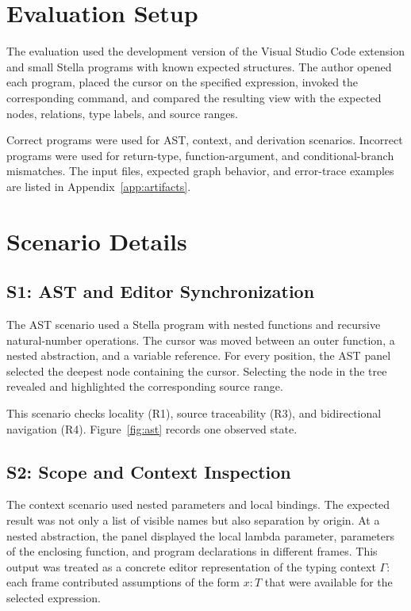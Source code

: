 \section{Evaluation Setup}

The evaluation used the development version of the Visual Studio Code extension and small Stella programs with known expected structures. The author opened each program, placed the cursor on the specified expression, invoked the corresponding command, and compared the resulting view with the expected nodes, relations, type labels, and source ranges.

Correct programs were used for AST, context, and derivation scenarios. Incorrect programs were used for return-type, function-argument, and conditional-branch mismatches. The input files, expected graph behavior, and error-trace examples are listed in Appendix~\ref{app:artifacts}.

\section{Scenario Details}

\subsection{S1: AST and Editor Synchronization}

The AST scenario used a Stella program with nested functions and recursive natural-number operations. The cursor was moved between an outer function, a nested abstraction, and a variable reference. For every position, the AST panel selected the deepest node containing the cursor. Selecting the node in the tree revealed and highlighted the corresponding source range.

This scenario checks locality (R1), source traceability (R3), and bidirectional navigation (R4). Figure~\ref{fig:ast} records one observed state.

\subsection{S2: Scope and Context Inspection}

The context scenario used nested parameters and local bindings. The expected result was not only a list of visible names but also separation by origin. At a nested abstraction, the panel displayed the local lambda parameter, parameters of the enclosing function, and program declarations in different frames. This output was treated as a concrete editor representation of the typing context $\Gamma$: each frame contributed assumptions of the form $x:T$ that were available for the selected expression.

